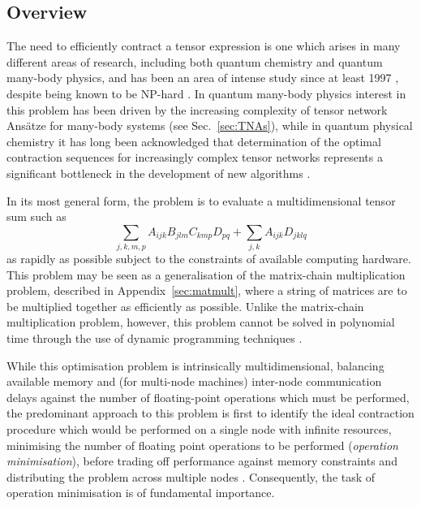 \documentclass[aps,pre,reprint,superscriptaddress,amsfonts,amsmath,showpacs,nofootinbib,floatfix]{revtex4-1}
\newcommand{\sref}[1]{Sec.~\ref{#1}}
\newcommand{\aref}[1]{Appendix~\ref{#1}}
\begin{document}
\subsection{Overview}

The need to efficiently contract a tensor expression is one which arises in many different areas of research, including both quantum chemistry and quantum many-body physics, and has been an area of intense study since at least 1997 \cite[see e.g.][]{auer2006,baumgartner2002,baumgartner2002a,baumgartner2005,cociorva2001,cociorva2001a,cociorva2002,cociorva2002a,cociorva2003,hartono2005,hartono2006,hirata2003,hirata2004,lam1997,lam1997a,lam1999,lam2000}, despite being known to be NP-hard \cite{lam1997}. %
In quantum many-body physics interest in this problem has been driven by the increasing complexity of tensor network Ans\"atze for many-body systems (see \sref{sec:TNAs}), while in quantum physical chemistry it has long been acknowledged that determination of the optimal contraction sequences for increasingly complex tensor networks represents a significant bottleneck in the development of new algorithms \cite{baumgartner2002,hirata2004,baumgartner2005,auer2006}. %

In its most general form, the problem is to evaluate a multidimensional tensor sum such as
\begin{equation}
\sum_{j,k,m,p}A_{ijk}B_{jlm}C_{kmp}D_{pq}+\sum_{j,k}A_{ijk}D_{jklq}
\end{equation}
as rapidly as possible subject to the constraints of available computing hardware. This problem may be seen as a generalisation of the matrix-chain multiplication problem, described in \aref{sec:matmult}, where a string of matrices are to be multiplied together as efficiently as possible. Unlike the matrix-chain multiplication problem, however, this problem cannot be solved in polynomial time through the use of dynamic programming techniques \cite{lam1997}.

While this optimisation problem is intrinsically multidimensional, balancing available memory and (for multi-node machines) inter-node communication delays against the number of floating-point operations which must be performed, the predominant approach to this problem is first to identify the ideal contraction procedure which would be performed on a single node with infinite resources, 
minimising the number of floating point operations to be performed (\emph{operation minimisation}),
before trading off performance against memory constraints and distributing the problem across multiple nodes \cite{baumgartner2002,cociorva2002,cociorva2002a,hirata2003,lam1997a,lam2000}. Consequently, the task of operation minimisation is of fundamental importance.
\end{document}
